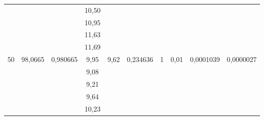 \documentclass[a4paper, 12pt]{article}
\begin{document}
\begin{table}[h!]
\begin{tabular}{|c|c|c|c|c|c|c|c|c|c|}
                    &                           &                           & 10,50          &                           &                                    &                    &                         &                            &                               \\ \cline{4-4}
                    &                           &                           & 10,95          &                           &                                    &                    &                         &                            &                               \\ \cline{4-4}
                    &                           &                           & 11,63          &                           &                                    &                    &                         &                            &                               \\ \cline{4-4}
                    &                           &                           & 11,69          &                           &                                    &                    &                         &                            &                               \\ \hline
\multirow{5}{*}{50} & \multirow{5}{*}{98,0665}  & \multirow{5}{*}{0,980665} & 9,95           & \multirow{5}{*}{9,62}     & \multirow{5}{*}{0,234636}          & \multirow{5}{*}{1} & \multirow{5}{*}{0,01}   & \multirow{5}{*}{0,0001039} & \multirow{5}{*}{0,0000027}    \\ \cline{4-4}
                    &                           &                           & 9,08           &                           &                                    &                    &                         &                            &                               \\ \cline{4-4}
                    &                           &                           & 9,21           &                           &                                    &                    &                         &                            &                               \\ \cline{4-4}
                    &                           &                           & 9,64           &                           &                                    &                    &                         &                            &                               \\ \cline{4-4}
                    &                           &                           & 10,23          &                           &                                    &                    &                         &                            &                               \\ \hline

\end{tabular}
\end{table}
\end{document}
